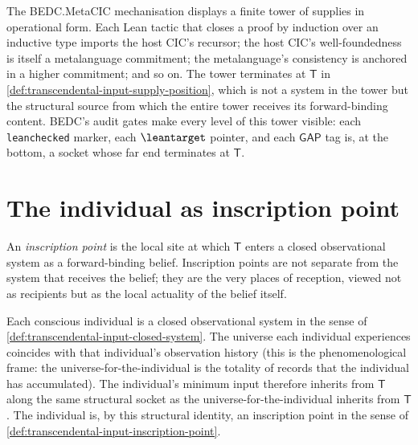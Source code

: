 \begin{example}
\label{ex:transcendental-input-bedc-stack}
The BEDC.MetaCIC mechanisation displays a finite tower of supplies in operational form. Each Lean tactic that closes a proof by induction over an inductive type imports the host CIC's recursor; the host CIC's well-foundedness is itself a metalanguage commitment; the metalanguage's consistency is anchored in a higher commitment; and so on. The tower terminates at $\mathsf{T}$ in \autoref{def:transcendental-input-supply-position}, which is not a system in the tower but the structural source from which the entire tower receives its forward-binding content. BEDC's audit gates make every level of this tower visible: each \texttt{leanchecked} marker, each $\leantarget$ pointer, and each $\mathsf{GAP}$ tag is, at the bottom, a socket whose far end terminates at $\mathsf{T}$.
\end{example}

\section{The individual as inscription point}
\label{sec:transcendental-input-inscription-point}

\begin{definition}
\label{def:transcendental-input-inscription-point}
An \emph{inscription point} is the local site at which $\mathsf{T}$ enters a closed observational system as a forward-binding belief. Inscription points are not separate from the system that receives the belief; they are the very places of reception, viewed not as recipients but as the local actuality of the belief itself.
\end{definition}

\begin{principle}
\label{prin:transcendental-input-individual-is-inscription}
Each conscious individual is a closed observational system in the sense of \autoref{def:transcendental-input-closed-system}. The universe each individual experiences coincides with that individual's observation history (this is the phenomenological frame: the universe-for-the-individual is the totality of records that the individual has accumulated). The individual's minimum input therefore inherits from $\mathsf{T}$ along the same structural socket as the universe-for-the-individual inherits from $\mathsf{T}$. The individual is, by this structural identity, an inscription point in the sense of \autoref{def:transcendental-input-inscription-point}.
\end{principle}

